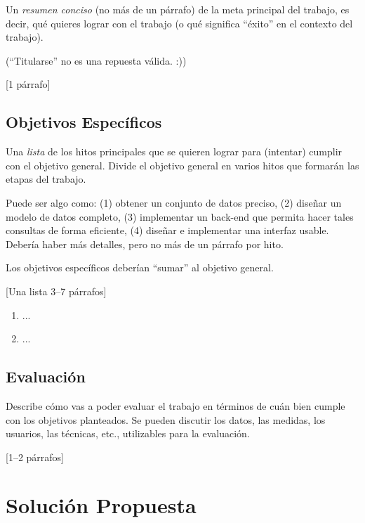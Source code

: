 \documentclass[informe,guia]{upropuesta}
\begin{document}
  \begin{pauta}
  Un \textit{resumen conciso} (no más de un párrafo) de la meta principal del trabajo, es decir, qué quieres lograr con el trabajo (o qué significa ``éxito'' en el contexto del trabajo).
  
  (``Titularse'' no es una repuesta válida. :))
  
  [1 párrafo]
  \end{pauta}

  \subsection*{Objetivos Específicos}\label{sec:obj-e}
  
  \begin{pauta}
  Una \textit{lista} de los hitos principales que se quieren lograr para (intentar) cumplir con el objetivo general. Divide el objetivo general en varios hitos que formarán las etapas del trabajo.
  
  Puede ser algo como: (1) obtener un conjunto de datos preciso, (2) diseñar un modelo de datos completo, (3) implementar un back-end que permita hacer tales consultas de forma eficiente, (4) diseñar e implementar una interfaz usable. Debería haber más detalles, pero no más de un párrafo por hito. 
  
  Los objetivos específicos deberían ``sumar'' al objetivo general.
  
  [Una lista 3--7 párrafos]
  \end{pauta}
  
  \begin{enumerate}
    \item ...
    \item ...
  \end{enumerate}
  
  \subsection*{Evaluación}\label{sec:eval}
  
  \begin{pauta}
  Describe cómo vas a poder evaluar el trabajo en términos de cuán bien  cumple con los objetivos planteados. Se pueden discutir los datos, las medidas, los usuarios, las técnicas, etc., utilizables para la evaluación.
  
  [1--2 párrafos]
  \end{pauta}

\section{Solución Propuesta}\label{sec:sol}
\end{document}
